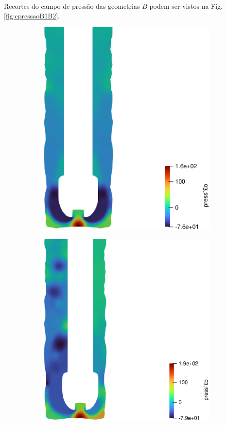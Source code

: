 Recortes do campo de pressão das geometrias $B$ podem ser vistos na Fig. \ref{fig:cpressaoB1B2}.
\begin{figure}[H]
        \centering
        \begin{subfigure}[b]{0.42\linewidth}
    		\includegraphics[width=\linewidth]{img/campo_press/rugoso/campo_de_pres_paraview.eps}
    	\end{subfigure}
    	\begin{subfigure}[b]{0.42\linewidth}
    		\includegraphics[width=\linewidth]{img/campo_press/rugoso/campo_de_pres_standoff_paraview.eps}

\end{subfigure}
\end{figure}
